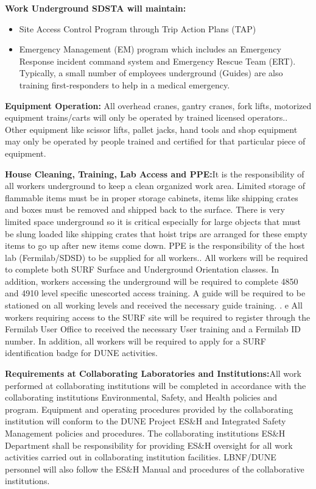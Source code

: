 {\bf Work Underground SDSTA will maintain:}
\begin{itemize}
    \item Site Access Control Program through Trip Action Plans (TAP)
    \item Emergency Management (EM) program which includes an Emergency Response incident command system and  Emergency Rescue Team (ERT).  Typically, a small number of employees underground (Guides) are also training first-responders to help in a medical emergency.
    
\end{itemize}

{\bf Equipment Operation:} All overhead cranes, gantry cranes, fork lifts, motorized equipment trains/carts will only be operated by trained licensed operators.. 
Other equipment like scissor lifts, pallet jacks, hand tools and shop equipment may only be operated by people trained
and certified for that particular piece of equipment.

{\bf House Cleaning, Training, Lab Access and PPE:}It is the responsibility of all workers underground to keep a clean organized work area. Limited storage of flammable items must be in proper storage cabinets, items like shipping crates and boxes must be removed and shipped back to the surface. There is very limited space underground so it is critical especially for large objects that must be slung loaded like shipping crates that hoist trips are arranged for these empty items to go up after new items come down. PPE is the responsibility of the host lab (Fermilab/SDSD) to be supplied for all workers.. All workers will be required to complete both SURF Surface and Underground Orientation classes. In addition, workers accessing the underground will be required to complete 4850 and 4910 level specific unescorted access training. A guide will be required to be stationed on all working levels and received the necessary guide training. .  e All workers requiring access to the SURF site will be required to register through the Fermilab User Office to received the necessary User training and a Fermilab ID number. In addition, all workers will be required to apply for a SURF identification badge for DUNE activities.

{\bf Requirements at Collaborating Laboratories and Institutions:}All work performed at collaborating institutions will be completed in accordance with the collaborating institutions Environmental, Safety, and Health policies and program. 
Equipment and operating procedures provided by the collaborating institution will conform to the DUNE Project ES\&H and Integrated Safety Management policies and procedures. 
The collaborating institutions ES\&H Department shall be responsibility for providing ES\&H oversight for all work activities carried out in collaborating institution facilities. 
LBNF/DUNE personnel will also follow the ES\&H Manual and procedures of the collaborative institutions.



